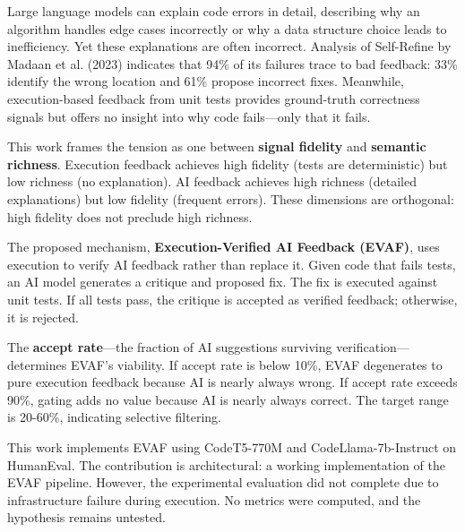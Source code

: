 
Large language models can explain code errors in detail, describing why an algorithm handles edge cases incorrectly or why a data structure choice leads to inefficiency. Yet these explanations are often incorrect. Analysis of Self-Refine by Madaan et al. (2023) indicates that 94\% of its failures trace to bad feedback: 33\% identify the wrong location and 61\% propose incorrect fixes. Meanwhile, execution-based feedback from unit tests provides ground-truth correctness signals but offers no insight into why code fails---only that it fails.

This work frames the tension as one between \textbf{signal fidelity} and \textbf{semantic richness}. Execution feedback achieves high fidelity (tests are deterministic) but low richness (no explanation). AI feedback achieves high richness (detailed explanations) but low fidelity (frequent errors). These dimensions are orthogonal: high fidelity does not preclude high richness.

The proposed mechanism, \textbf{Execution-Verified AI Feedback (EVAF)}, uses execution to verify AI feedback rather than replace it. Given code that fails tests, an AI model generates a critique and proposed fix. The fix is executed against unit tests. If all tests pass, the critique is accepted as verified feedback; otherwise, it is rejected.

The \textbf{accept rate}---the fraction of AI suggestions surviving verification---determines EVAF's viability. If accept rate is below 10\%, EVAF degenerates to pure execution feedback because AI is nearly always wrong. If accept rate exceeds 90\%, gating adds no value because AI is nearly always correct. The target range is 20-60\%, indicating selective filtering.

This work implements EVAF using CodeT5-770M and CodeLlama-7b-Instruct on HumanEval. The contribution is architectural: a working implementation of the EVAF pipeline. However, the experimental evaluation did not complete due to infrastructure failure during execution. No metrics were computed, and the hypothesis remains untested.
